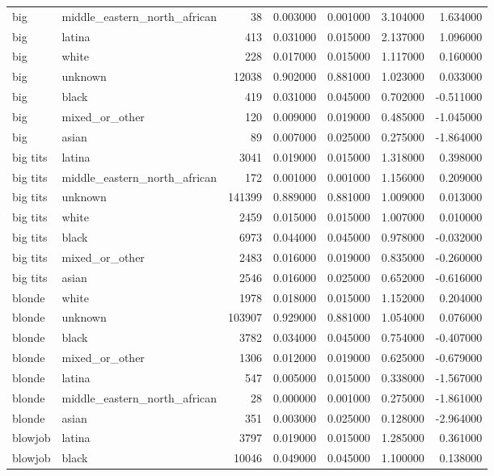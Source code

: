 \begin{tabular}{llrrrrr}
big & middle_eastern_north_african & 38 & 0.003000 & 0.001000 & 3.104000 & 1.634000 \\
big & latina & 413 & 0.031000 & 0.015000 & 2.137000 & 1.096000 \\
big & white & 228 & 0.017000 & 0.015000 & 1.117000 & 0.160000 \\
big & unknown & 12038 & 0.902000 & 0.881000 & 1.023000 & 0.033000 \\
big & black & 419 & 0.031000 & 0.045000 & 0.702000 & -0.511000 \\
big & mixed_or_other & 120 & 0.009000 & 0.019000 & 0.485000 & -1.045000 \\
big & asian & 89 & 0.007000 & 0.025000 & 0.275000 & -1.864000 \\
big tits & latina & 3041 & 0.019000 & 0.015000 & 1.318000 & 0.398000 \\
big tits & middle_eastern_north_african & 172 & 0.001000 & 0.001000 & 1.156000 & 0.209000 \\
big tits & unknown & 141399 & 0.889000 & 0.881000 & 1.009000 & 0.013000 \\
big tits & white & 2459 & 0.015000 & 0.015000 & 1.007000 & 0.010000 \\
big tits & black & 6973 & 0.044000 & 0.045000 & 0.978000 & -0.032000 \\
big tits & mixed_or_other & 2483 & 0.016000 & 0.019000 & 0.835000 & -0.260000 \\
big tits & asian & 2546 & 0.016000 & 0.025000 & 0.652000 & -0.616000 \\
blonde & white & 1978 & 0.018000 & 0.015000 & 1.152000 & 0.204000 \\
blonde & unknown & 103907 & 0.929000 & 0.881000 & 1.054000 & 0.076000 \\
blonde & black & 3782 & 0.034000 & 0.045000 & 0.754000 & -0.407000 \\
blonde & mixed_or_other & 1306 & 0.012000 & 0.019000 & 0.625000 & -0.679000 \\
blonde & latina & 547 & 0.005000 & 0.015000 & 0.338000 & -1.567000 \\
blonde & middle_eastern_north_african & 28 & 0.000000 & 0.001000 & 0.275000 & -1.861000 \\
blonde & asian & 351 & 0.003000 & 0.025000 & 0.128000 & -2.964000 \\
blowjob & latina & 3797 & 0.019000 & 0.015000 & 1.285000 & 0.361000 \\
blowjob & black & 10046 & 0.049000 & 0.045000 & 1.100000 & 0.138000 \\

\end{tabular}

